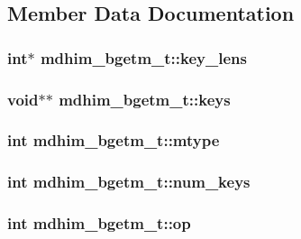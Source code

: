 \subsection{Member Data Documentation}
\hypertarget{structmdhim__bgetm__t_a1bda084b30e5429093159a78827efb52}{
\subsubsection[{key\-\_\-lens}]{\setlength{\rightskip}{0pt plus 5cm}int$\ast$ mdhim\-\_\-bgetm\-\_\-t\-::key\-\_\-lens}}\label{d5/def/structmdhim__bgetm__t_a1bda084b30e5429093159a78827efb52}
\hypertarget{structmdhim__bgetm__t_a6abc6929954a3e7aab4b71f12b9db668}{
\subsubsection[{keys}]{\setlength{\rightskip}{0pt plus 5cm}void$\ast$$\ast$ mdhim\-\_\-bgetm\-\_\-t\-::keys}}\label{d5/def/structmdhim__bgetm__t_a6abc6929954a3e7aab4b71f12b9db668}
\hypertarget{structmdhim__bgetm__t_aa52b25716fcf7fdc26af4dd48056d976}{
\subsubsection[{mtype}]{\setlength{\rightskip}{0pt plus 5cm}int mdhim\-\_\-bgetm\-\_\-t\-::mtype}}\label{d5/def/structmdhim__bgetm__t_aa52b25716fcf7fdc26af4dd48056d976}
\hypertarget{structmdhim__bgetm__t_aa065cf914ef318fefe986048cc5347ca}{
\subsubsection[{num\-\_\-keys}]{\setlength{\rightskip}{0pt plus 5cm}int mdhim\-\_\-bgetm\-\_\-t\-::num\-\_\-keys}}\label{d5/def/structmdhim__bgetm__t_aa065cf914ef318fefe986048cc5347ca}
\hypertarget{structmdhim__bgetm__t_aa4e54e836da625bad6ebc439c5f9e047}{
\subsubsection[{op}]{\setlength{\rightskip}{0pt plus 5cm}int mdhim\-\_\-bgetm\-\_\-t\-::op}}\label{d5/def/structmdhim__bgetm__t_aa4e54e836da625bad6ebc439c5f9e047}
